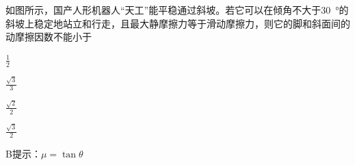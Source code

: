如图所示，国产人形机器人“天工”能平稳通过斜坡。若它可以在倾角不大于\qty{30}{\degree}的斜坡上稳定地站立和行走，且最大静摩擦力等于滑动摩擦力，则它的脚和斜面间的动摩擦因数不能小于\paren[]
\begin{choices}
	\item\(\frac{1}{2}\)
	\item\(\frac{\sqrt{3}}{3}\)
	\item\(\frac{\sqrt{2}}{2}\)
	\item\(\frac{\sqrt{3}}{2}\)
\end{choices}
\begin{answer}
    B\qquad 提示：\(\mu = \tan\theta \)
\end{answer}